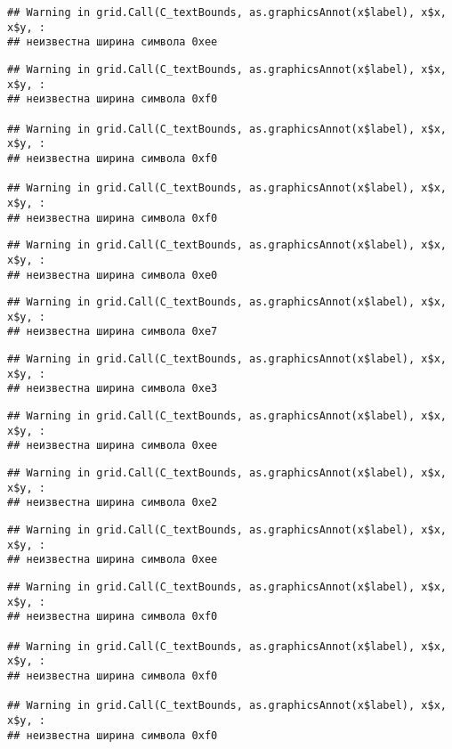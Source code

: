 \documentclass[
]{article}
\begin{document}
\begin{verbatim}
## Warning in grid.Call(C_textBounds, as.graphicsAnnot(x$label), x$x, x$y, :
## неизвестна ширина символа 0xee
\end{verbatim}

\begin{verbatim}
## Warning in grid.Call(C_textBounds, as.graphicsAnnot(x$label), x$x, x$y, :
## неизвестна ширина символа 0xf0

## Warning in grid.Call(C_textBounds, as.graphicsAnnot(x$label), x$x, x$y, :
## неизвестна ширина символа 0xf0

## Warning in grid.Call(C_textBounds, as.graphicsAnnot(x$label), x$x, x$y, :
## неизвестна ширина символа 0xf0
\end{verbatim}

\begin{verbatim}
## Warning in grid.Call(C_textBounds, as.graphicsAnnot(x$label), x$x, x$y, :
## неизвестна ширина символа 0xe0
\end{verbatim}

\begin{verbatim}
## Warning in grid.Call(C_textBounds, as.graphicsAnnot(x$label), x$x, x$y, :
## неизвестна ширина символа 0xe7
\end{verbatim}

\begin{verbatim}
## Warning in grid.Call(C_textBounds, as.graphicsAnnot(x$label), x$x, x$y, :
## неизвестна ширина символа 0xe3
\end{verbatim}

\begin{verbatim}
## Warning in grid.Call(C_textBounds, as.graphicsAnnot(x$label), x$x, x$y, :
## неизвестна ширина символа 0xee
\end{verbatim}

\begin{verbatim}
## Warning in grid.Call(C_textBounds, as.graphicsAnnot(x$label), x$x, x$y, :
## неизвестна ширина символа 0xe2
\end{verbatim}

\begin{verbatim}
## Warning in grid.Call(C_textBounds, as.graphicsAnnot(x$label), x$x, x$y, :
## неизвестна ширина символа 0xee
\end{verbatim}

\begin{verbatim}
## Warning in grid.Call(C_textBounds, as.graphicsAnnot(x$label), x$x, x$y, :
## неизвестна ширина символа 0xf0

## Warning in grid.Call(C_textBounds, as.graphicsAnnot(x$label), x$x, x$y, :
## неизвестна ширина символа 0xf0

## Warning in grid.Call(C_textBounds, as.graphicsAnnot(x$label), x$x, x$y, :
## неизвестна ширина символа 0xf0
\end{verbatim}
\end{document}
